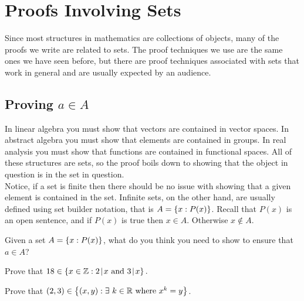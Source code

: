 \chapter{Proofs Involving Sets}

Since most structures in mathematics are collections of objects, many of the proofs we write are related to sets.  The proof techniques we use are the same ones we have seen before, but there are proof techniques associated with sets that work in general and are usually expected by an audience.
\begin{center}
\end{center}

\section{Proving $a \in A$}

In linear algebra you must show that vectors are contained in vector spaces.  In abstract algebra you must show that elements are contained in groups.  In real analysis you must show that functions are contained in functional spaces.  All of these structures are sets, so the proof boils down to showing that the object in question is in the set in question.\\

Notice, if a set is finite then there should be no issue with showing that a given element is contained in the set.  Infinite sets, on the other hand, are usually defined using set builder notation, that is $A = \left\{x : P(x)\right\}$.  Recall that $P(x)$ is an open sentence, and if $P(x)$ is true then $x \in A$. Otherwise $x \notin A$.
\begin{question}
\item Given a set $A=\left\{x : P(x)\right\}$, what do you think you need to show to ensure that $a \in A$?
\vspace{1.5in}
\newpage
\item Prove that $18 \in \left\{x \in \mathbb{Z} : 2 \! \mid \! x \ \mbox{and} \ 3\! \mid \! x\right\}.$

\vspace{2in}

\item Prove that $(2,3) \in \set{(x,y): \exists\ k \in \R \ \mbox{where} \ x^k=y}$.

\vspace{2in}

\end{question}

